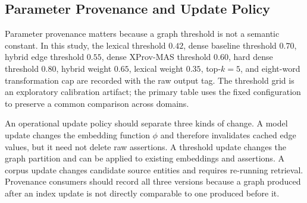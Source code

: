 \documentclass{ieeeaccess}
\begin{document}
\begin{table}[!ht]
\centering
\caption{Serialization contract for a provenance assertion.}
\label{tab:contract}
\end{table}

\subsection{Parameter Provenance and Update Policy}
Parameter provenance matters because a graph threshold is not a semantic constant. In this study, the lexical threshold $0.42$, dense baseline threshold $0.70$, hybrid edge threshold $0.55$, dense XProv-MAS threshold $0.60$, hard dense threshold $0.80$, hybrid weight $0.65$, lexical weight $0.35$, top-$k=5$, and eight-word transformation cap are recorded with the raw output tag. The threshold grid is an exploratory calibration artifact; the primary table uses the fixed configuration to preserve a common comparison across domains.

An operational update policy should separate three kinds of change. A model update changes the embedding function $\phi$ and therefore invalidates cached edge values, but it need not delete raw assertions. A threshold update changes the graph partition and can be applied to existing embeddings and assertions. A corpus update changes candidate source entities and requires re-running retrieval. Provenance consumers should record all three versions because a graph produced after an index update is not directly comparable to one produced before it.
\end{document}
